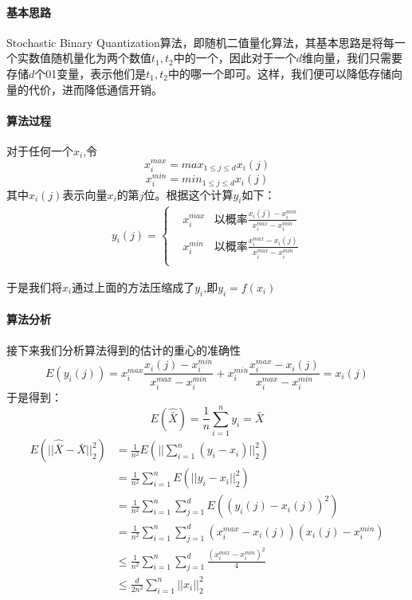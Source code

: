 \documentclass[lang=cn,newtx,10pt,scheme=chinese,chinesefont=nofont,citestyle=gb7714-2015, bibstyle=gb7714-2015]{elegantbook}
\begin{document}
\begin{refsection}
\paragraph{基本思路} Stochastic Binary Quantization算法，即随机二值量化算法，其基本思路是将每一个实数值随机量化为两个数值$t_{1},t_{2}$中的一个，因此对于一个$d$维向量，我们只需要存储$d$个01变量，表示他们是$t_{1},t_{2}$中的哪一个即可。这样，我们便可以降低存储向量的代价，进而降低通信开销。

\paragraph{算法过程} 对于任何一个$x_{i}$,令
\[x_{i}^{max} = max_{1 \leq j \leq d} x_{i}(j)\]
\[x_{i}^{min} = min_{1 \leq j \leq d} x_{i}(j)\]
其中$x_{i}(j)$表示向量$x_{i}$的第$j$位。根据这个计算$y_{i}$如下：
\begin{align}
\nonumber
y_{i}(j) = \left\{
\begin{aligned}
\nonumber
&x_{i}^{max}  &\text{以概率}\frac{x_{i}(j) - x_{i}^{min}}{x_{i}^{max} - x_{i}^{min}}\\
&x_{i}^{min}  &\text{以概率}\frac{x_{i}^{max} - x_{i}(j)}{x_{i}^{max} - x_{i}^{min}}\\
\end{aligned}
\right.
\end{align}

于是我们将$x_{i}$通过上面的方法压缩成了$y_{i}$,即$y_{i} = f(x_{i})$

\paragraph{算法分析} 接下来我们分析算法得到的估计的重心的准确性
\[
E(y_{i}(j)) = x_{i}^{max}\frac{x_{i}(j) - x_{i}^{min}}{x_{i}^{max} - x_{i}^{min}} + x_{i}^{min}\frac{x_{i}^{max} - x_{i}(j)}{x_{i}^{max} - x_{i}^{min}} = x_{i}(j)
\]
于是得到：
\[
E(\hat{\bar{X}}) = \frac{1}{n} \sum_{i = 1}^{n} y_{i} = \bar{X}
\]
\begin{align*}
    E(||\hat{\bar{X}} - \bar{X}||_{2}^2)
    &= \frac{1}{n^2} E(||\sum_{i =1}^{n}(y_{i} - x_{i})||_{2}^2)\\
    &= \frac{1}{n^2} \sum_{i=1}^{n}E(||y_{i} - x_{i}||_{2}^2)\\
    &= \frac{1}{n^2} \sum_{i=1}^{n} \sum_{j = 1}^{d} E((y_{i}(j) - x_{i}(j))^2)\\
    &= \frac{1}{n^2} \sum_{i=1}^{n} \sum_{j = 1}^{d} (x_{i}^{max} - x_{i}(j))(x_{i}(j) - x_{i}^{min})\\
    &\leq \frac{1}{n^2} \sum_{i=1}^{n} \sum_{j = 1}^{d} \frac{(x_{i}^{max} - x_{i}^{min})^2}{4}\\
    &\leq \frac{d}{2n^2} \sum_{i =1}^{n}||x_{i}||_{2}^2\\
\end{align*}


\end{refsection}
\end{document}

